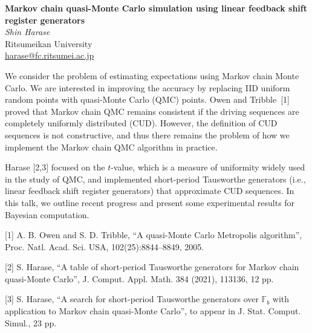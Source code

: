 \documentclass[12pt,a4paper,figuresright]{book}
\newenvironment{talk}[6]%
 {%
  \vskip 0pt\nopagebreak%
 \vskip 0pt\nopagebreak%
  \textbf{#1}\vspace{3mm}\\\nopagebreak%
  \textit{#2}\\\nopagebreak%
  #3\\\nopagebreak%
  \url{#4}\vspace{3mm}\\\nopagebreak%
  \ifthenelse{\equal{#5}{}}{}{Coauthor(s): #5\vspace{3mm}\\\nopagebreak}%
  \ifthenelse{\equal{#6}{}}{}{Special session: #6\quad \vspace{3mm}\\\nopagebreak}%
 }
 {\vspace{1cm}\\\nopagebreak}%
\begin{document}
\begin{talk}
  {Markov chain quasi-Monte Carlo simulation using linear feedback shift register generators}%
  {Shin Harase}%
  {Ritsumeikan University}%
  {harase@fc.ritsumei.ac.jp}%
  {}%
  {}%
				
We consider the problem of estimating expectations using Markov chain Monte Carlo.
We are interested in improving the accuracy by replacing IID uniform random points with quasi-Monte Carlo (QMC) points. 
Owen and Tribble~[1] proved that 
Markov chain QMC remains consistent if the driving sequences are completely uniformly distributed (CUD). 
However, the definition of CUD sequences is not constructive, and 
thus there remains the problem of how we implement the Markov chain QMC algorithm in practice. 

Harase [2,3] focused on the $t$-value, which is a measure of 
uniformity widely used in the study of QMC, and implemented 
short-period Tausworthe generators (i.e., linear feedback shift register generators) 
that approximate CUD sequences. 
In this talk, we outline recent progress and 
present some experimental results for Bayesian computation. 

\medskip

%
%
[1] A. B. Owen and S. D. Tribble, ``A quasi-{M}onte {C}arlo {M}etropolis algorithm'',  Proc. Natl. Acad. Sci. USA, 102(25):8844–8849, 2005.

%
[2] S. Harase, ``A table of short-period {T}ausworthe generators for {M}arkov chain quasi-{M}onte {C}arlo'',  {J}. {C}omput. {A}ppl. {M}ath. 384 (2021), 113136, 12 pp.

%
[3] S. Harase, ``A search for short-period Tausworthe generators over $\mathbb{F}_b$ with application to Markov chain quasi-Monte Carlo'', to appear in J. Stat. Comput. Simul., 23 pp.
\end{talk}
\end{document}
